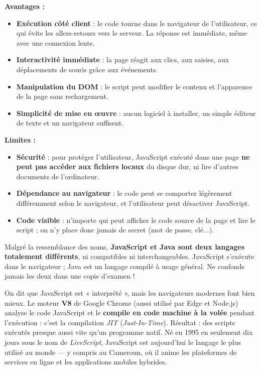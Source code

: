 \documentclass[11pt]{article}
\newcommand{\cle}[1]{{\popxbold\color{popdark}#1}}
\begin{document}
\begin{propriete}
\textbf{Avantages :}
\begin{itemize}
    \item \textbf{Exécution côté client} : le code tourne dans le navigateur de l'utilisateur, ce qui évite les allers-retours vers le serveur. La réponse est immédiate, même avec une connexion lente.
    \item \textbf{Interactivité immédiate} : la page réagit aux clics, aux saisies, aux déplacements de souris grâce aux \cle{événements}.
    \item \textbf{Manipulation du DOM} : le script peut modifier le contenu et l'apparence de la page sans rechargement.
    \item \textbf{Simplicité de mise en œuvre} : aucun logiciel à installer, un simple éditeur de texte et un navigateur suffisent.
\end{itemize}
\textbf{Limites :}
\begin{itemize}
    \item \textbf{Sécurité} : pour protéger l'utilisateur, JavaScript exécuté dans une page \textbf{ne peut pas accéder aux fichiers locaux} du disque dur, ni lire d'autres documents de l'ordinateur.
    \item \textbf{Dépendance au navigateur} : le code peut se comporter légèrement différemment selon le navigateur, et l'utilisateur peut désactiver JavaScript.
    \item \textbf{Code visible} : n'importe qui peut afficher le code source de la page et lire le script ; on n'y place donc jamais de secret (mot de passe, clé...).
\end{itemize}
\end{propriete}

\begin{attention}
Malgré la ressemblance des noms, \textbf{JavaScript et Java sont deux langages totalement différents}, ni compatibles ni interchangeables. JavaScript s'exécute dans le navigateur ; Java est un langage compilé à usage général. Ne confonds jamais les deux dans une copie d'examen !
\end{attention}

\begin{savaistu}
On dit que JavaScript est « interprété », mais les navigateurs modernes font bien mieux. Le moteur \textbf{V8} de Google Chrome (aussi utilisé par Edge et Node.js) analyse le code JavaScript et le \textbf{compile en code machine à la volée} pendant l'exécution : c'est la compilation \emph{JIT} (\emph{Just-In-Time}). Résultat : des scripts exécutés presque aussi vite qu'un programme natif. Né en 1995 en seulement dix jours sous le nom de \emph{LiveScript}, JavaScript est aujourd'hui le langage le plus utilisé au monde — y compris au Cameroun, où il anime les plateformes de services en ligne et les applications mobiles hybrides.
\end{savaistu}
\end{document}
